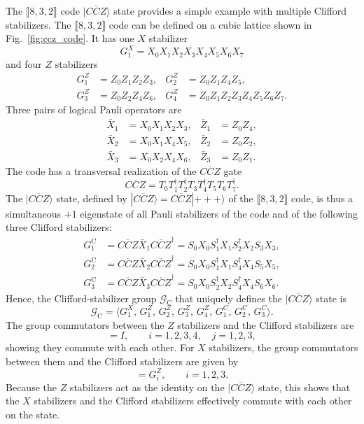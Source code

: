\documentclass[
 reprint,
 amsmath,amssymb,
 pra,superscriptaddress, nofootinbib
]{revtex4-2}
\theoremstyle{definition}
\theoremstyle{plain}
\begin{document}
The $\llbracket 8,3,2 \rrbracket$ code $|\overline{CCZ}\rangle$ state provides a simple example with multiple Clifford stabilizers. 
The $\llbracket 8,3,2 \rrbracket$ code can be defined on a cubic lattice shown in Fig.~\ref{fig:ccz_code}. It has one $X$ stabilizer
\begin{equation}
G^X_1=X_0X_1X_2X_3X_4X_5X_6X_7
\end{equation}
and four $Z$ stabilizers
\begin{align}
G^Z_1&=Z_0Z_1Z_2Z_3,&
G^Z_2&=Z_0Z_1Z_4Z_5,\nonumber\\
G^Z_3&=Z_0Z_2Z_4Z_6,&
G^Z_4&=Z_0Z_1Z_2Z_3Z_4Z_5Z_6Z_7.
\end{align}
Three pairs of logical Pauli operators are
\begin{align}
\bar{X}_1&=X_0X_1X_2X_3,&
\bar{Z}_1&=Z_0Z_4,\nonumber\\
\bar{X}_2&=X_0X_1X_4X_5,&
\bar{Z}_2&=Z_0Z_2,\nonumber\\
\bar{X}_3&=X_0X_2X_4X_6,&
\bar{Z}_3&=Z_0Z_1.
\end{align}
The code has a transversal realization of the $\overline{CCZ}$ gate
\begin{equation}
\overline{CCZ}=T_0T^\dagger_1T^\dagger_2T_3T^\dagger_4T_5T_6T^\dagger_7.
\end{equation}
The $|\overline{CCZ}\rangle$ state, defined by  $|\overline{CCZ}\rangle=\overline{CCZ}|\overline{+++} \rangle$ of the $\llbracket 8,3,2 \rrbracket$ code, is thus a simultaneous $+1$ eigenstate of all Pauli stabilizers of the code and of the following three Clifford stabilizers:
\begin{align}
G^\mathrm{C}_1&=\overline{CCZ}\bar{X}_1\overline{CCZ}^\dagger=S_0X_0S^\dagger_1X_1S^\dagger_2X_2S_3X_3,\nonumber\\
G^\mathrm{C}_2&=\overline{CCZ}\bar{X}_2\overline{CCZ}^\dagger=S_0X_0S^\dagger_1X_1S^\dagger_4X_4S_5X_5,\nonumber\\
G^\mathrm{C}_3&=\overline{CCZ}\bar{X}_3\overline{CCZ}^\dagger=S_0X_0S^\dagger_2X_2S^\dagger_4X_4S_6X_6.
\end{align}
Hence, the Clifford-stabilizer group $\mathcal{G}_\mathrm{C}$ that uniquely defines the $|\overline{CCZ}\rangle$ state is
\begin{equation}
\mathcal{G}_\mathrm{C}=\langle G^X_1,\, G^Z_1,\, G^Z_2,\,G^Z_3,\, G^Z_4, \, G^C_1, \, G^C_2, \, G^C_3\rangle.
\end{equation}
The group commutators between the $Z$ stabilizers and the Clifford stabilizers are 
\begin{equation}
[G^Z_i,G^\mathrm{C}_j]=I,
\qquad i=1,2,3,4, \quad j=1,2,3,
\end{equation}
showing they commute with each other.
For $X$ stabilizers, the group commutators between them and the Clifford stabilizers are given by
\begin{equation}
[G^X_1,G^\mathrm{C}_i]=G^Z_i,
\qquad i=1,2,3.
\end{equation}
Because the $Z$ stabilizers act as the identity on the $|\overline{CCZ}\rangle$ state, this shows that the $X$ stabilizers and the Clifford stabilizers effectively commute with each other on the state.
\end{document}
